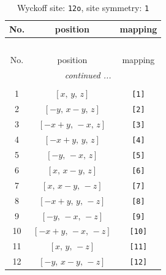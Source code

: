 \documentclass[fleqn,8pt]{jsarticle}
\begin{document}
\renewcommand{\arraystretch}{1.2}
\begin{longtable}{ccc}
\caption{Wyckoff site: {\tt 12o}, site symmetry: {\tt 1}}
 \\
 \hline \hline
No. & position & mapping \\ \hline \endfirsthead

\multicolumn{2}{l}{\tablename\ \thetable{}} \\
 \hline \hline
No. & position & mapping \\ \hline \endhead

 \hline \hline
\multicolumn{2}{r}{\footnotesize\it continued ...} \\ \endfoot

 \hline \hline
\multicolumn{2}{r}{} \\ \endlastfoot

1 & $\left[ x,\, y,\, z \right]$ & {\tt [1]} \\ \hline
2 & $\left[ - y,\, x - y,\, z \right]$ & {\tt [2]} \\ \hline
3 & $\left[ - x + y,\, - x,\, z \right]$ & {\tt [3]} \\ \hline
4 & $\left[ - x + y,\, y,\, z \right]$ & {\tt [4]} \\ \hline
5 & $\left[ - y,\, - x,\, z \right]$ & {\tt [5]} \\ \hline
6 & $\left[ x,\, x - y,\, z \right]$ & {\tt [6]} \\ \hline
7 & $\left[ x,\, x - y,\, - z \right]$ & {\tt [7]} \\ \hline
8 & $\left[ - x + y,\, y,\, - z \right]$ & {\tt [8]} \\ \hline
9 & $\left[ - y,\, - x,\, - z \right]$ & {\tt [9]} \\ \hline
10 & $\left[ - x + y,\, - x,\, - z \right]$ & {\tt [10]} \\ \hline
11 & $\left[ x,\, y,\, - z \right]$ & {\tt [11]} \\ \hline
12 & $\left[ - y,\, x - y,\, - z \right]$ & {\tt [12]} \\
\end{longtable}
\end{document}
